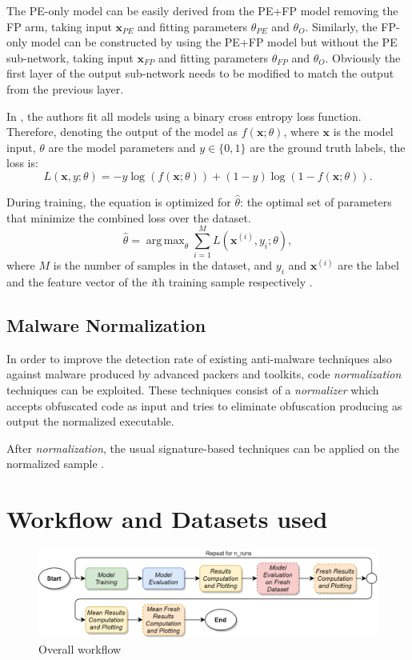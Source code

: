 \documentclass[pdfa%
,cucitura%
]{toptesi}
\DeclareMathOperator*{\argmax}{arg\,max}
\begin{document}
The PE-only model can be easily derived from the PE+FP model removing the FP arm, taking input $\textbf{x}_{PE}$ and fitting parameters $\theta_{PE}$ and $\theta_{O}$. Similarly, the FP-only model can be constructed by using the PE+FP model but without the PE sub-network, taking input $\textbf{x}_{FP}$ and fitting parameters $\theta_{FP}$ and $\theta_{O}$. Obviously the first layer of the output sub-network needs to be modified to match the output from the previous layer.

In \cite{KyadigeLFCEIFPIBMD}, the authors fit all models using a binary cross entropy loss function. Therefore, denoting the output of the model as $f(\textbf{x}; \theta)$, where $\textbf{x}$ is the model input, $\theta$ are the model parameters and $y \in \{0,1\}$ are the ground truth labels, the loss is:
\begin{equation} \label{eq:LearningFromContextLoss}
	L(\textbf{x}, y; \theta) = - y \log{(f(\textbf{x}; \theta))} + (1 - y) \log{(1 - f(\textbf{x}; \theta))}.
\end{equation}

During training, the equation is optimized for $\hat{\theta}$: the optimal set of parameters that minimize the combined loss over the dataset.
\begin{equation} \label{eq:LearningFromContextParameters}
	\hat{\theta} =  \argmax_{\theta} \sum_{i = 1}^{M} L(\textbf{x}^{(i)}, y_i; \theta),
\end{equation}
where $M$ is the number of samples in the dataset, and $y_i$ and $\textbf{x}^{(i)}$ are the label and the feature vector of the \textit{i}th training sample respectively \cite{KyadigeLFCEIFPIBMD}.

\section{Malware Normalization}
In order to improve the detection rate of existing anti-malware techniques also against malware produced by advanced packers and toolkits, code \textit{normalization} techniques can be exploited. These techniques consist of a \textit{normalizer} which accepts obfuscated code as input and tries to eliminate obfuscation producing as output the normalized executable.

After \textit{normalization}, the usual signature-based techniques can be applied on the normalized sample \cite{Sharma_2014}.

\chapter{Workflow and Datasets used}
\begin{figure}[h!]
	\centering
	\includegraphics[width=\textwidth]{./images/workflow.png}
	\caption[Overall workflow]{Overall workflow}
	\label{fig:workflow}
\end{figure}
\end{document}
